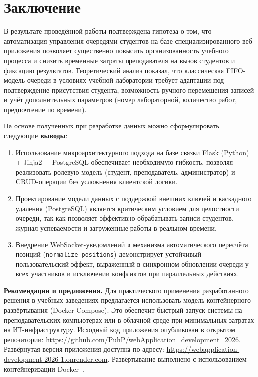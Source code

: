 \section*{Заключение}

В результате проведённой работы подтверждена гипотеза о том, что 
автоматизация управления очередями студентов на базе специализированного 
веб-приложения позволяет существенно повысить организованность учебного 
процесса и снизить временные затраты преподавателя на вызов студентов и 
фиксацию результатов. Теоретический анализ показал, что классическая 
FIFO-модель очереди в условиях учебной лаборатории требует адаптации под 
подтверждение присутствия студента, возможность ручного перемещения записей 
и учёт дополнительных параметров (номер лабораторной, количество работ, 
предпочтение по времени).

На основе полученных при разработке данных можно сформулировать следующие 
\textbf{выводы}:

\begin{enumerate}
    \item Использование микроархитектурного подхода на базе связки Flask 
    (Python) + Jinja2 + PostgreSQL обеспечивает необходимую гибкость, 
    позволяя реализовать ролевую модель (студент, преподаватель, 
    администратор) и CRUD-операции без усложнения клиентской логики.
    \item Проектирование модели данных с поддержкой внешних ключей и 
    каскадного удаления (PostgreSQL) является критическим условием 
    для целостности очереди, так как позволяет эффективно обрабатывать 
    записи студентов, журнал успеваемости и загруженные работы в реальном 
    времени.
    \item Внедрение WebSocket-уведомлений и механизма автоматического 
    пересчёта позиций (\texttt{normalize\_positions}) демонстрирует 
    устойчивый пользовательский эффект, выраженный в синхронном обновлении 
    очереди у всех участников и исключении конфликтов при параллельных 
    действиях.
\end{enumerate}

\textbf{Рекомендации и предложения.} Для практического применения разработанного
решения в учебных заведениях предлагается использовать модель контейнерного
развёртывания (Docker Compose). Это обеспечит быстрый запуск системы на
преподавательских компьютерах или в облачной среде при минимальных затратах
на ИТ-инфраструктуру. Исходный код приложения опубликован в открытом репозитории:
\url{https://github.com/PuhP/webApplication_development_2026}.
Развёрнутая версия приложения доступна по адресу:
\url{https://webapplication-development-2026-1.onrender.com}.
Развёртывание выполнено с использованием контейнеризации Docker~\cite{docker_docs}.

